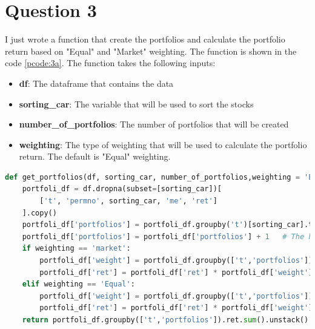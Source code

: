 \section*{Question 3}
I just wrote a function that create the portfolios and calculate the portfolio return based on "Equal" and "Market" weighting. The function is shown in the code \ref{pcode:3a}. The function takes the following inputs:
\begin{itemize}
    \item \textbf{df}: The dataframe that contains the data
    \item \textbf{sorting\_car}: The variable that will be used to sort the stocks
    \item \textbf{number\_of\_portfolios}: The number of portfolios that will be created
    \item \textbf{weighting}: The type of weighting that will be used to calculate the portfolio return. The default is "Equal" weighting.
\end{itemize}

\begin{lstlisting}[language=Python, caption= Python function to create portfolios, label={pcode:3a}, escapechar=|, frame=single, basicstyle=\small, showstringspaces=false, captionpos=b, breaklines=true, showspaces=false, showtabs=false, keywordstyle=\color{blue}, commentstyle=\color{gray}]
    def get_portfolios(df, sorting_car, number_of_portfolios,weighting = 'Equal'):
    portfoli_df = df.dropna(subset=[sorting_car])[
        ['t', 'permno', sorting_car, 'me', 'ret']
    ].copy()
    portfoli_df['portfolios'] = portfoli_df.groupby('t')[sorting_car].transform(lambda x: pd.qcut(x, number_of_portfolios, labels=False)) 
    portfoli_df['portfolios'] = portfoli_df['portfolios'] + 1   # The highest value is the highest portfolio
    if weighting == 'market':
        portfoli_df['weight'] = portfoli_df.groupby(['t','portfolios'])['me'].transform(lambda x: x/sum(x))
        portfoli_df['ret'] = portfoli_df['ret'] * portfoli_df['weight']
    elif weighting == 'Equal':
        portfoli_df['weight'] = portfoli_df.groupby(['t','portfolios'])['me'].transform(lambda x: 1/len(x))
        portfoli_df['ret'] = portfoli_df['ret'] * portfoli_df['weight']
    return portfoli_df.groupby(['t','portfolios']).ret.sum().unstack().reset_index().rename(columns = {"t":"month"})
\end{lstlisting}

